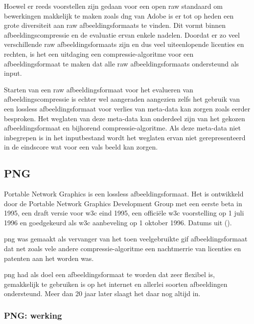 Hoewel er reeds voorstellen zijn gedaan voor een open \gls{raw} standaard om bewerkingen makkelijk te maken zoals \gls{dng} van Adobe is er tot op heden een grote diversiteit aan \gls{raw} \glspl{afbeeldingsformaat} te vinden. Dit vormt binnen \gls{afbeeldingscompressie} en de evaluatie ervan enkele nadelen. Doordat er zo veel verschillende \gls{raw} \glspl{afbeeldingsformaat} zijn en dus veel uiteenlopende licenties en rechten, is het een uitdaging een \gls{compressie-algoritme} voor een \gls{afbeeldingsformaat} te maken dat alle \gls{raw} \glspl{afbeeldingsformaat} ondersteund als input. 

Starten van een \gls{raw} \gls{afbeeldingsformaat} voor het evalueren van \gls{afbeeldingscompressie} is echter wel aangeraden aangezien zelfs het gebruik van een \gls{lossless} \gls{afbeeldingsformaat} voor verlies van \gls{meta-data} kan zorgen zoals eerder besproken. Het weglaten van deze \gls{meta-data} kan onderdeel zijn van het gekozen \gls{afbeeldingsformaat} en bijhorend \gls{compressie-algoritme}. Als deze \gls{meta-data} niet inbegrepen is in het inputbestand wordt het weglaten ervan niet gerepresenteerd in de eindscore wat voor een vals beeld kan zorgen.

\subsection{PNG}
\label{sec:afbeeldingscompressie-png}

Portable Network Graphics is een \gls{lossless} \gls{afbeeldingsformaat}. Het is ontwikkeld door de Portable Network Graphics Development Group met een eerste beta in 1995, een draft versie voor \gls{w3c} eind 1995, een officiële \gls{w3c} voorstelling op 1 juli 1996 en goedgekeurd als \gls{w3c} aanbeveling op 1 oktober 1996. Datums uit  (\cite{pnghistory}).

\Gls{png} was gemaakt als vervanger van het toen veelgebruikte \gls{gif} \gls{afbeeldingsformaat} dat net zoals vele andere \gls{compressie-algoritme} een nachtmerrie van licenties en patenten aan het worden was. 

\Gls{png} had als doel een \gls{afbeeldingsformaat} te worden dat zeer flexibel is, gemakkelijk te gebruiken is op het internet en allerlei soorten afbeeldingen ondersteund. Meer dan 20 jaar later slaagt het daar nog altijd in.

\subsubsection{PNG: werking}
\label{sec:afbeeldingscompressie-png-werking}

